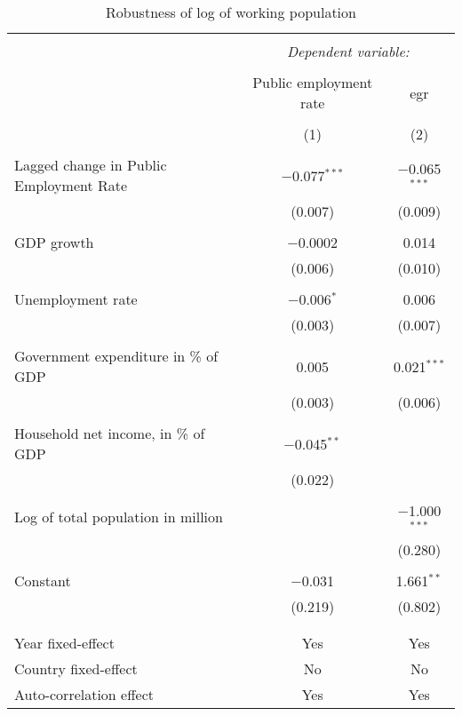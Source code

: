 
\begin{table}[!htbp] \centering 
  \caption{Robustness of log of working population} 
  \label{} 
\begin{tabular}{@{\extracolsep{5pt}}lcc} 
\\[-1.8ex]\hline 
\hline \\[-1.8ex] 
 & \multicolumn{2}{c}{\textit{Dependent variable:}} \\ 
\cline{2-3} 
\\[-1.8ex] & Public employment rate & egr \\ 
\\[-1.8ex] & (1) & (2)\\ 
\hline \\[-1.8ex] 
 Lagged change in Public Employment Rate & $-$0.077$^{***}$ & $-$0.065$^{***}$ \\ 
  & (0.007) & (0.009) \\ 
  & & \\ 
 GDP growth & $-$0.0002 & 0.014 \\ 
  & (0.006) & (0.010) \\ 
  & & \\ 
 Unemployment rate & $-$0.006$^{*}$ & 0.006 \\ 
  & (0.003) & (0.007) \\ 
  & & \\ 
 Government expenditure in \% of GDP & 0.005 & 0.021$^{***}$ \\ 
  & (0.003) & (0.006) \\ 
  & & \\ 
 Household net income, in \% of GDP & $-$0.045$^{**}$ &  \\ 
  & (0.022) &  \\ 
  & & \\ 
 Log of total population in million &  & $-$1.000$^{***}$ \\ 
  &  & (0.280) \\ 
  & & \\ 
 Constant & $-$0.031 & 1.661$^{**}$ \\ 
  & (0.219) & (0.802) \\ 
  & & \\ 
\hline \\[-1.8ex] 
Year fixed-effect & Yes & Yes \\ 
Country fixed-effect & No & No \\ 
Auto-correlation effect & Yes & Yes \\ 

\end{tabular}
\end{table}
